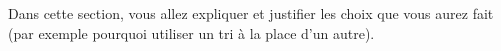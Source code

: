 Dans cette section, vous allez expliquer et justifier les choix que vous aurez fait (par exemple pourquoi utiliser un tri à la place d'un autre).